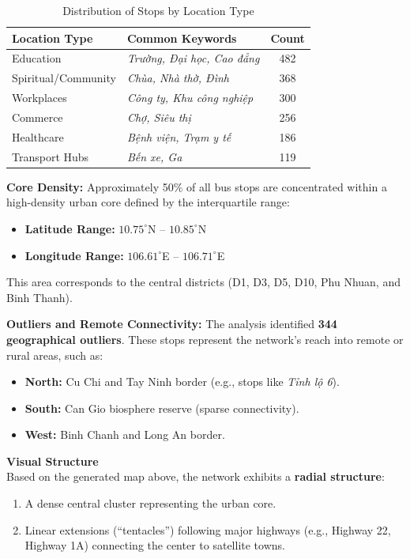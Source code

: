 \begin{table}[H]
    \centering
    \caption{Distribution of Stops by Location Type}
    \vspace{0.2cm}
    \begin{tabular}{|l|l|c|}
        \hline
        \textbf{Location Type} & \textbf{Common Keywords} & \textbf{Count} \\
        \hline
        Education & \textit{Trường, Đại học, Cao đẳng} & 482 \\
        \hline
        Spiritual/Community & \textit{Chùa, Nhà thờ, Đình} & 368 \\
        \hline
        Workplaces & \textit{Công ty, Khu công nghiệp} & 300 \\
        \hline
        Commerce & \textit{Chợ, Siêu thị} & 256 \\
        \hline
        Healthcare & \textit{Bệnh viện, Trạm y tế} & 186 \\
        \hline
        Transport Hubs & \textit{Bến xe, Ga} & 119 \\
        \hline
    \end{tabular}
\end{table}

\textbf{Core Density:} Approximately 50\% of all bus stops are concentrated within a high-density urban core defined by the interquartile range:
\begin{itemize}
    \item \textbf{Latitude Range:} $10.75^\circ$N -- $10.85^\circ$N
    \item \textbf{Longitude Range:} $106.61^\circ$E -- $106.71^\circ$E
\end{itemize}
This area corresponds to the central districts (D1, D3, D5, D10, Phu Nhuan, and Binh Thanh).

\textbf{Outliers and Remote Connectivity:} The analysis identified \textbf{344 geographical outliers}. These stops represent the network's reach into remote or rural areas, such as:
\begin{itemize}
    \item \textbf{North:} Cu Chi and Tay Ninh border (e.g., stops like \textit{Tỉnh lộ 6}).
    \item \textbf{South:} Can Gio biosphere reserve (sparse connectivity).
    \item \textbf{West:} Binh Chanh and Long An border.
\end{itemize}


\textbf{Visual Structure}\\
Based on the generated map above, the network exhibits a \textbf{radial structure}:
\begin{enumerate}
    \item A dense central cluster representing the urban core.
    \item Linear extensions (``tentacles'') following major highways (e.g., Highway 22, Highway 1A) connecting the center to satellite towns.
\end{enumerate}


